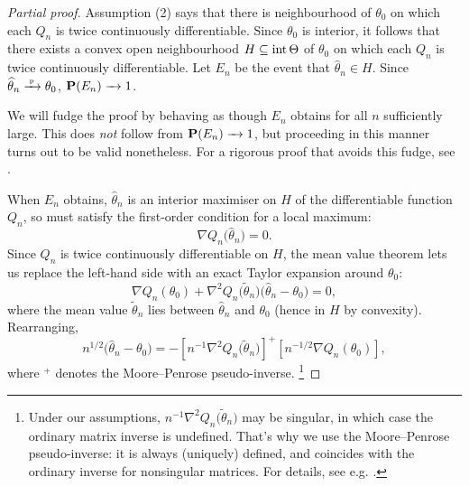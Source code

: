 \documentclass[11pt,letterpaper,reqno,oneside]{article}
\begin{document}
\begin{proof}[Partial proof]
	Assumption (2) says that there is neighbourhood of $\theta_0$ on which each $Q_n$ is twice continuously differentiable. Since $\theta_0$ is interior, it follows that there exists a convex open neighbourhood $H \subseteq \operatorname*{int} \Theta$ of $\theta_0$ on which each $Q_n$ is twice continuously differentiable. Let $E_n$ be the event that $\widehat{\theta}_n \in H$. Since $\widehat{\theta}_n \xrightarrow{{\scriptscriptstyle \mathrm{\;p\;}}} \theta_0$, $\mathbf{P}(E_n) \xrightarrow{\;\;\;} 1$.

	We will fudge the proof by behaving as though $E_n$ obtains for all $n$ sufficiently large. This does \emph{not} follow from $\mathbf{P}(E_n) \xrightarrow{\;\;\;} 1$, but proceeding in this manner turns out to be valid nonetheless. For a rigorous proof that avoids this fudge, see \textcite[][`A complete proof of Theorem 3.1', p. 2152]{NeweyMcfadden1994}.

	When $E_n$ obtains, $\widehat{\theta}_n$ is an interior maximiser on $H$ of the differentiable function $Q_n$, so must satisfy the first-order condition for a local maximum:
	\begin{equation*}
		\nabla Q_n\bigl( \widehat{\theta}_n \bigr) = 0 .
	\end{equation*}
	Since $Q_n$ is twice continuously differentiable on $H$, the mean value theorem lets us replace the left-hand side with an exact Taylor expansion around $\theta_0$:
	\begin{equation*}
		\nabla Q_n\left( \theta_0 \right)
		+ \nabla^2 Q_n\bigl( \widetilde{\theta}_n \bigr)
		\bigl( \widehat{\theta}_n - \theta_0 \bigr) 
		= 0 ,
	\end{equation*}
	where the mean value $\widetilde{\theta}_n$ lies between $\widehat{\theta}_n$ and $\theta_0$ (hence in $H$ by convexity). Rearranging,
	\begin{equation*}
		n^{1/2} \bigl( \widehat{\theta}_n - \theta_0 \bigr)  
		= - \left[ n^{-1} \nabla^2 Q_n\bigl( \widetilde{\theta}_n \bigr) \right]^+
		\left[ n^{-1/2} \nabla Q_n\left( \theta_0 \right) \right] ,
	\end{equation*}
	where $^+$ denotes the Moore--Penrose pseudo-inverse.%
		\footnote{Under our assumptions, $n^{-1} \nabla^2 Q_n\bigl( \widetilde{\theta}_n \bigr)$ may be singular, in which case the ordinary matrix inverse is undefined. That's why we use the Moore--Penrose pseudo-inverse: it is always (uniquely) defined, and coincides with the ordinary inverse for nonsingular matrices. For details, see e.g. \textcite[][sec. 1.b.5 \& 1.c.5]{Rao1973}.}


\end{proof}
\end{document}
